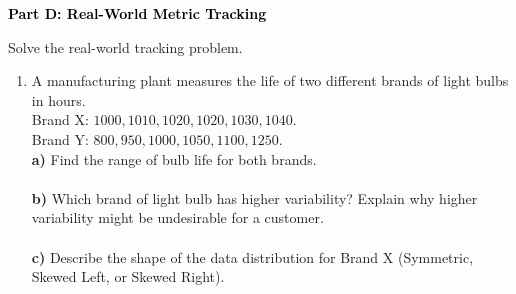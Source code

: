 \documentclass[12pt, letterpaper, fleqn]{article}
\newcommand{\blanklong}{\underline{\hspace{6.5cm}}}
\begin{document}
\newpage

\begin{tcolorbox}[colback=black!10]
    \large\textcolor{black}{\textbf{Part D: Real-World Metric Tracking}}
\end{tcolorbox}

\vspace{3mm}

\noindent
Solve the real-world tracking problem.

\vspace{5mm}

\begin{enumerate}[itemsep=2.5cm, leftmargin=0.6cm]
\item A manufacturing plant measures the life of two different brands of light bulbs in hours. \\
Brand X: $1000, 1010, 1020, 1020, 1030, 1040$. \\
Brand Y: $800, 950, 1000, 1050, 1100, 1250$. \\
\textbf{a)} Find the range of bulb life for both brands. \\
\blanklong \\
\textbf{b)} Which brand of light bulb has higher variability? Explain why higher variability might be undesirable for a customer. \\
\blanklong \\
\textbf{c)} Describe the shape of the data distribution for Brand X (Symmetric, Skewed Left, or Skewed Right). \\
\blanklong
\end{enumerate}
\end{document}
